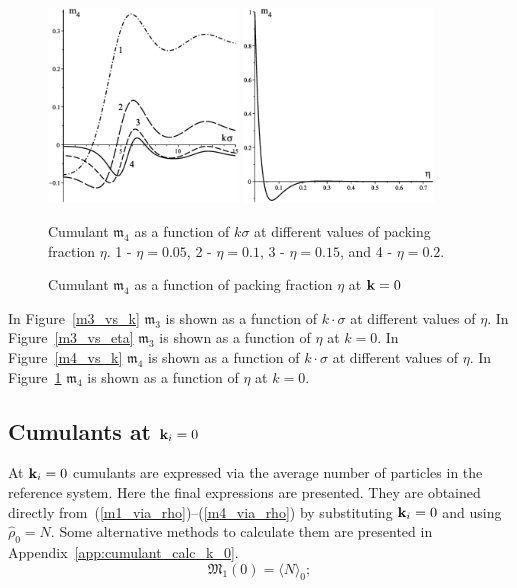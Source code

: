 \begin{figure}[htbp]
	\includegraphics[width=0.45\textwidth,angle=0]{M4_as_function_of_k_at_different_eta} \hfill
	\includegraphics[width=0.45\textwidth,angle=0]{M4_as_function_of_eta_at_k_equals_0} \\
	\parbox{0.5\textwidth}{\caption{\label{m4_vs_k} Cumulant $\mathfrak{m}_4$ as a function of $k\sigma$ at different values of packing fraction $\eta$. 1 - $\eta = 0.05$, 2 - $\eta=0.1$, 3 - $\eta = 0.15$, and 4 - $\eta=0.2$.
	}} \hfill
	\parbox{0.45\textwidth}{\caption{\label{m4_vs_eta} Cumulant $\mathfrak{m}_4$ as a function of packing fraction $\eta$ at $\vb k = 0$
	}}
\end{figure}
In Figure~\ref{m3_vs_k} $\mathfrak{m}_3$ is shown as a function of $k\cdot\sigma$ at different values of $\eta$. In Figure~\ref{m3_vs_eta} $\mathfrak{m}_3$ is shown as a function of $\eta$ at $k=0$.
In Figure~\ref{m4_vs_k} $\mathfrak{m}_4$ is shown as a function of $k\cdot\sigma$ at different values of $\eta$. In Figure~\ref{m4_vs_eta} $\mathfrak{m}_4$ is shown as a function of $\eta$ at $k=0$.

\subsection{Cumulants at $\vb k_i = 0$}
At $\vb k_i = 0$ cumulants are expressed via the average number of particles in the reference system.
Here the final expressions are presented. They are obtained directly from~(\ref{m1_via_rho})--(\ref{m4_via_rho}) by substituting $\vb k_i=0$ and using $\hat{\rho}_0 = N$. Some alternative methods to calculate them are presented in Appendix~\ref{app:cumulant_calc_k_0}.
\begin{equation}
	\mathfrak{M}_1(0) = \langle N \rangle_0;
\end{equation}

